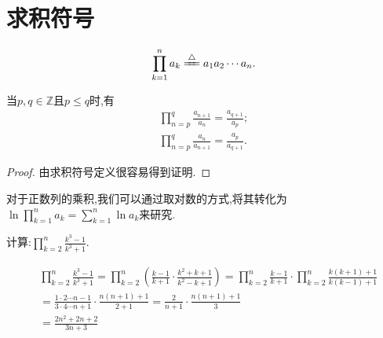 \documentclass[../../main.tex]{subfiles}
\begin{document}
\section{求积符号}

\begin{definition}[求积符号]\label{definition:求积符号}
\begin{align*}
\prod_{k=1}^n{a_k}\xlongequal{\bigtriangleup}a_1a_2\cdots a_n. 
\end{align*}
\end{definition}

\begin{theorem}[基本结论]\label{theorem:求积符号基本结论}
当$p,q\in \mathbb{Z}$且$p\leq q$时,有
\begin{gather*}
\prod_{n=p}^q{\frac{a_{n+1}}{a_n}}=\frac{a_{q+1}}{a_p};
\\
\prod_{n=p}^q{\frac{a_n}{a_{n+1}}}=\frac{a_p}{a_{q+1}}.
\end{gather*}
\end{theorem}
\begin{proof}
由求积符号定义很容易得到证明.
\end{proof}
\begin{remark}
对于正数列的乘积,我们可以通过取对数的方式,将其转化为$\ln \prod_{k=1}^n{a_k}=\sum\limits_{k=1}^n{\ln a_k}$来研究.
\end{remark}
\begin{example}
计算:$\prod_{k=2}^n{\frac{k^3-1}{k^3+1}}$.
\end{example}
\begin{solution}
\begin{align*}
&\prod_{k=2}^n{\frac{k^3-1}{k^3+1}}=\prod_{k=2}^n{\left( \frac{k-1}{k+1}\cdot \frac{k^2+k+1}{k^2-k+1} \right)}=\prod_{k=2}^n{\frac{k-1}{k+1}\cdot}\prod_{k=2}^n{\frac{k\left( k+1 \right) +1}{k\left( k-1 \right) +1}}
\\
&=\frac{1\cdot 2\cdots n-1}{3\cdot 4\cdots n+1}\cdot \frac{n\left( n+1 \right) +1}{2+1}=\frac{2}{n+1}\cdot \frac{n\left( n+1 \right) +1}{3}
\\
&=\frac{2n^2+2n+2}{3n+3}
\end{align*}
\end{solution}
\end{document}
